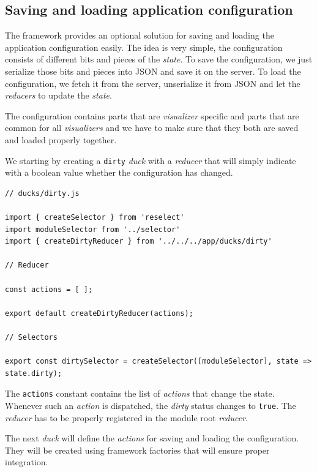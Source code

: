 \subsection{Saving and loading application configuration}
\label{sec:implementation:integration:configuration}

The framework provides an optional solution for saving and loading the application configuration easily. The idea is very simple, the configuration consists of different bits and pieces of the \emph{state}. To save the configuration, we just serialize those bits and pieces into JSON and save it on the server. To load the configuration, we fetch it from the server, unserialize it from JSON and let the \emph{reducers} to update the \emph{state}.

The configuration contains parts that are \emph{visualizer} specific and parts that are common for all \emph{visualizers} and we have to make sure that they both are saved and loaded properly together.

We starting by creating a \texttt{dirty} \emph{duck} with a \emph{reducer} that will simply indicate with a boolean value whether the configuration has changed.

\begin{verbatim}
// ducks/dirty.js

import { createSelector } from 'reselect'
import moduleSelector from '../selector'
import { createDirtyReducer } from '../../../app/ducks/dirty'

// Reducer

const actions = [ ];

export default createDirtyReducer(actions);

// Selectors

export const dirtySelector = createSelector([moduleSelector], state => state.dirty);
\end{verbatim}

The \texttt{actions} constant contains the list of \emph{actions} that change the state. Whenever such an \emph{action} is dispatched, the \emph{dirty} status changes to \texttt{true}. The \emph{reducer} has to be properly registered in the module root \emph{reducer}.

The next \emph{duck} will define the \emph{actions} for saving and loading the configuration. They will be created using framework factories that will ensure proper integration.

